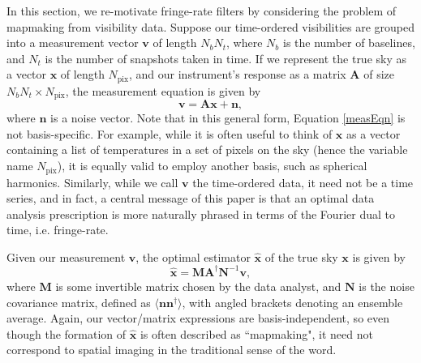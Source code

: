 \documentclass[twocolumn,apj,numberedappendix]{emulateapj}
\newcommand{\vis}{\mathbf{v}}
\newcommand{\x}{\mathbf{x}}
\newcommand{\xhat}{\hat{\mathbf{x}}}
\newcommand{\A}{\mathbf{A}}
\newcommand{\N}{\mathbf{N}}
\begin{document}

In this section, we re-motivate fringe-rate filters by
considering the problem of mapmaking from visibility data.  
Suppose our time-ordered visibilities are grouped into a measurement vector
$\vis$ of length $N_b N_t$, where $N_b$ is the number of baselines, and $N_t$
is the number of snapshots taken in time.  If we represent the true sky as a
vector $\x$ of length $N_\textrm{pix}$, and our instrument's response as a
matrix $\A$ of size $N_b N_t \times N_\textrm{pix}$, the measurement equation
is given by
\begin{equation}
\label{measEqn}
\vis = \A \x + \mathbf{n},
\end{equation}
where $\mathbf{n}$ is a noise vector.  Note that in this general form, Equation
\eqref{measEqn} is not basis-specific.  For example, while it is often useful
to think of $\x$ as a vector containing a list of temperatures in a set of
pixels on the sky (hence the variable name $N_\textrm{pix}$), it is equally
valid to employ another basis, such as spherical harmonics.  Similarly, while
we call $\vis$ the time-ordered data, it need not be a time series, and in
fact, a central message of this paper is that an optimal data analysis
prescription is more naturally phrased in terms of the Fourier dual to time,
i.e. fringe-rate.

Given our measurement $\vis$, the optimal estimator $\xhat$ of the true sky
$\x$ is given by \citep{Tegmark97,Morales2009,dillon_et_al2015}
\begin{equation}
\label{optEst}
\xhat = \mathbf{M} \A^\dagger \N^{-1} \vis,
\end{equation}
where $\mathbf{M}$ is some invertible matrix chosen by the data analyst, and
$\N$ is the noise covariance matrix, defined as $\langle \mathbf{n}
\mathbf{n}^\dagger \rangle$, with angled brackets denoting an ensemble average.
Again, our vector/matrix expressions are basis-independent, so even though the
formation of $\xhat$ is often described as ``mapmaking", it need not correspond
to spatial imaging in the traditional sense of the word.
\end{document}
